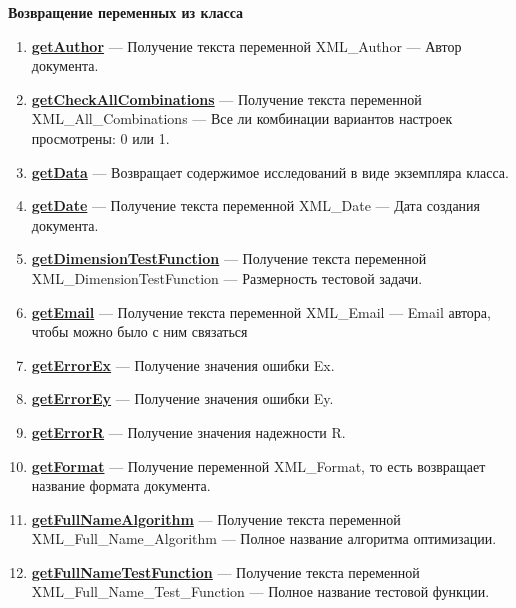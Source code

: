 \textbf{Возвращение переменных из класса}
\begin{enumerate}

\item \textbf{\hyperref[getAuthor]{getAuthor}} --- Получение текста переменной XML\_Author --- Автор документа.

\item \textbf{\hyperref[getCheckAllCombinations]{getCheckAllCombinations}} --- Получение текста переменной  XML\_All\_Combinations --- Все ли комбинации вариантов настроек просмотрены: 0 или 1.

\item \textbf{\hyperref[getData]{getData}} --- Возвращает содержимое исследований в виде экземпляра класса.

\item \textbf{\hyperref[getDate]{getDate}} --- Получение текста переменной  XML\_Date --- Дата создания документа.

\item \textbf{\hyperref[getDimensionTestFunction]{getDimensionTestFunction}} --- Получение текста переменной  XML\_DimensionTestFunction --- Размерность тестовой задачи.

\item \textbf{\hyperref[getEmail]{getEmail}} --- Получение текста переменной  XML\_Email --- Email автора, чтобы можно было с ним связаться

\item \textbf{\hyperref[getErrorEx]{getErrorEx}} --- Получение значения ошибки Ex.

\item \textbf{\hyperref[getErrorEy]{getErrorEy}} --- Получение значения ошибки Ey.

\item \textbf{\hyperref[getErrorR]{getErrorR}} --- Получение значения надежности R.

\item \textbf{\hyperref[getFormat]{getFormat}} --- Получение переменной XML\_Format, то есть возвращает название формата документа.

\item \textbf{\hyperref[getFullNameAlgorithm]{getFullNameAlgorithm}} --- Получение текста переменной  XML\_Full\_Name\_Algorithm --- Полное название алгоритма оптимизации.

\item \textbf{\hyperref[getFullNameTestFunction]{getFullNameTestFunction}} --- Получение текста переменной  XML\_Full\_Name\_Test\_Function --- Полное название тестовой функции.


\end{enumerate}
